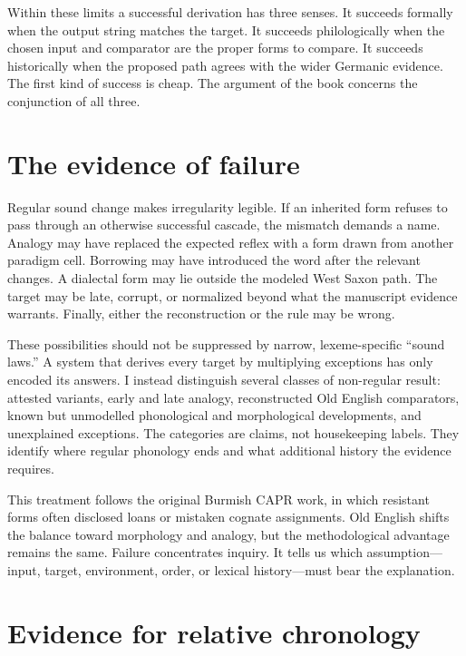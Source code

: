\documentclass[
  british,
  a4paper,
  openany]{book}
\begin{document}
Within these limits a successful derivation has three senses. It
succeeds formally when the output string matches the target. It succeeds
philologically when the chosen input and comparator are the proper forms
to compare. It succeeds historically when the proposed path agrees with
the wider Germanic evidence. The first kind of success is cheap. The
argument of the book concerns the conjunction of all three.

\section{The evidence of failure}\label{the-evidence-of-failure}

Regular sound change makes irregularity legible. If an inherited form
refuses to pass through an otherwise successful cascade, the mismatch
demands a name. Analogy may have replaced the expected reflex with a
form drawn from another paradigm cell. Borrowing may have introduced the
word after the relevant changes. A dialectal form may lie outside the
modeled West Saxon path. The target may be late, corrupt, or normalized
beyond what the manuscript evidence warrants. Finally, either the
reconstruction or the rule may be wrong.

These possibilities should not be suppressed by narrow, lexeme-specific
``sound laws.'' A system that derives every target by multiplying
exceptions has only encoded its answers. I instead distinguish several
classes of non-regular result: attested variants, early and late
analogy, reconstructed Old English comparators, known but unmodelled
phonological and morphological developments, and unexplained exceptions.
The categories are claims, not housekeeping labels. They identify where
regular phonology ends and what additional history the evidence
requires.

This treatment follows the original Burmish CAPR work, in which
resistant forms often disclosed loans or mistaken cognate assignments.
Old English shifts the balance toward morphology and analogy, but the
methodological advantage remains the same. Failure concentrates inquiry.
It tells us which assumption---input, target, environment, order, or
lexical history---must bear the explanation.

\section{Evidence for relative
chronology}\label{evidence-for-relative-chronology}
\end{document}
